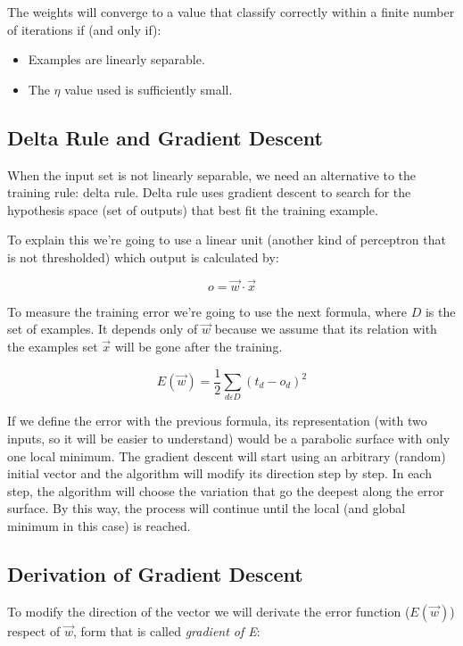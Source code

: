 	The weights will converge to a value that classify correctly within a finite number of iterations if (and only if):
	\begin{itemize}
		\item Examples are linearly separable.
		\item The $\eta$ value used is sufficiently small.
	\end{itemize}
	
	\subsection{Delta Rule and Gradient Descent}
	When the input set is not linearly separable, we need an alternative to the training rule: delta rule. Delta rule uses gradient descent to search for the hypothesis space (set of outputs) that best fit the training example. 

	To explain this we’re going to use a linear unit (another kind of perceptron that is not thresholded) which output is calculated by:
	
	\begin{equation}
		\label{linear_unit}
		o = \vec{w} \cdot \vec{x}
	\end{equation}

	To measure the training error we’re going to use the next formula, where $D$ is the set of examples. It depends only of $\vec{w}$ because we assume that its relation with the examples set $\vec{x}$ will be gone after the training.

	\begin{equation}
		\label{error_function_full_square}
		E(\vec{w}) = \frac{1}{2} \sum_{d \varepsilon D} (t_d-o_d)^2 
	\end{equation}

	If we define the error with the previous formula, its representation (with two inputs, so it will be easier to understand) would be a parabolic surface with only one local minimum. The gradient descent will start using an arbitrary (random) initial vector and the algorithm will modify its direction step by step. In each step, the algorithm will choose the variation that go the deepest along the error surface. By this way, the process will continue until the local (and global minimum in this case) is reached.

	\subsection{Derivation of Gradient Descent}
	To modify the direction of the vector we will derivate the error function ($E(\vec{w})$) respect of $\vec{w}$, form that is called \textit{gradient of E}:

